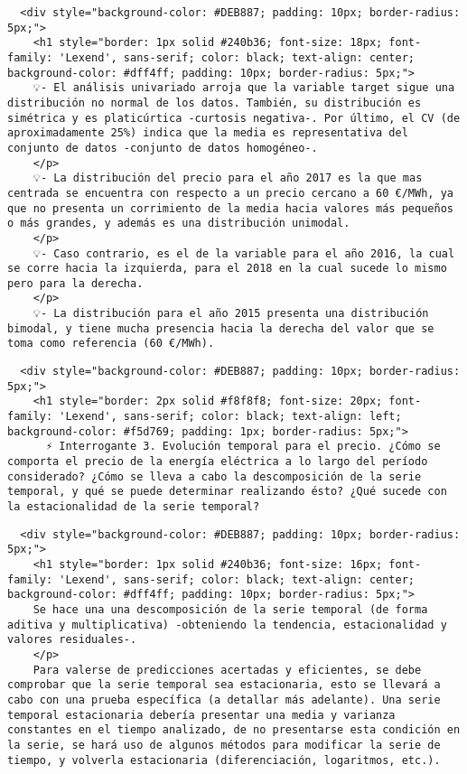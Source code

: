 \documentclass[11pt]{article}
\begin{document}
    \begin{verbatim}
  <div style="background-color: #DEB887; padding: 10px; border-radius: 5px;">
    <h1 style="border: 1px solid #240b36; font-size: 18px; font-family: 'Lexend', sans-serif; color: black; text-align: center; background-color: #dff4ff; padding: 10px; border-radius: 5px;">
    💡- El análisis univariado arroja que la variable target sigue una distribución no normal de los datos. También, su distribución es simétrica y es platicúrtica -curtosis negativa-. Por último, el CV (de aproximadamente 25%) indica que la media es representativa del conjunto de datos -conjunto de datos homogéneo-.
    </p>
    💡- La distribución del precio para el año 2017 es la que mas centrada se encuentra con respecto a un precio cercano a 60 €/MWh, ya que no presenta un corrimiento de la media hacia valores más pequeños o más grandes, y además es una distribución unimodal.
    </p>
    💡- Caso contrario, es el de la variable para el año 2016, la cual se corre hacia la izquierda, para el 2018 en la cual sucede lo mismo pero para la derecha.
    </p>
    💡- La distribución para el año 2015 presenta una distribución bimodal, y tiene mucha presencia hacia la derecha del valor que se toma como referencia (60 €/MWh).
\end{verbatim}

    \begin{verbatim}
  <div style="background-color: #DEB887; padding: 10px; border-radius: 5px;">
    <h1 style="border: 2px solid #f8f8f8; font-size: 20px; font-family: 'Lexend', sans-serif; color: black; text-align: left; background-color: #f5d769; padding: 1px; border-radius: 5px;">
      ⚡ Interrogante 3. Evolución temporal para el precio. ¿Cómo se comporta el precio de la energía eléctrica a lo largo del período considerado? ¿Cómo se lleva a cabo la descomposición de la serie temporal, y qué se puede determinar realizando ésto? ¿Qué sucede con la estacionalidad de la serie temporal?        
\end{verbatim}

    \begin{verbatim}
  <div style="background-color: #DEB887; padding: 10px; border-radius: 5px;">
    <h1 style="border: 1px solid #240b36; font-size: 16px; font-family: 'Lexend', sans-serif; color: black; text-align: center; background-color: #dff4ff; padding: 10px; border-radius: 5px;">
    Se hace una una descomposición de la serie temporal (de forma aditiva y multiplicativa) -obteniendo la tendencia, estacionalidad y valores residuales-.
    </p>
    Para valerse de predicciones acertadas y eficientes, se debe comprobar que la serie temporal sea estacionaria, esto se llevará a cabo con una prueba específica (a detallar más adelante). Una serie temporal estacionaria debería presentar una media y varianza constantes en el tiempo analizado, de no presentarse esta condición en la serie, se hará uso de algunos métodos para modificar la serie de tiempo, y volverla estacionaria (diferenciación, logaritmos, etc.).
\end{verbatim}
\end{document}
